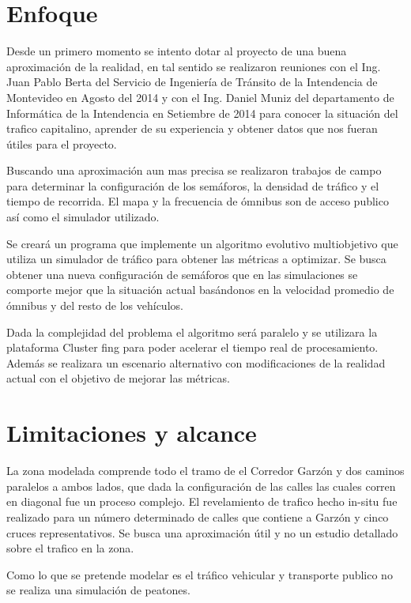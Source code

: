  
\section{Enfoque}

Desde un primero momento se intento dotar al proyecto de una buena aproximación de la realidad, en tal sentido se realizaron reuniones con el Ing. Juan Pablo Berta del Servicio de Ingeniería de Tránsito de la Intendencia de Montevideo en Agosto del  2014 y con el Ing. Daniel Muniz del departamento de Informática de la Intendencia en Setiembre de 2014 para conocer la situación del trafico capitalino, aprender de su experiencia y obtener datos que nos fueran útiles para el proyecto.


Buscando una aproximación aun mas precisa se realizaron trabajos de campo para determinar la configuración de los semáforos, la densidad de tráfico y el tiempo de recorrida. El mapa y la frecuencia de ómnibus son de acceso publico así como el simulador utilizado.

Se creará un programa que implemente un algoritmo evolutivo multiobjetivo que utiliza un simulador de tráfico para obtener las métricas a optimizar. Se busca obtener una nueva configuración de semáforos que en las simulaciones se comporte mejor que la situación actual basándonos en la velocidad promedio de ómnibus y del resto de los vehículos.

Dada la complejidad del problema el algoritmo será paralelo y se utilizara la plataforma Cluster fing para poder acelerar el tiempo real de procesamiento. Además se realizara un escenario alternativo con modificaciones de la realidad actual con el objetivo de mejorar las métricas.

\section{Limitaciones y alcance}

La zona modelada comprende todo el tramo de el Corredor Garzón y dos caminos paralelos a ambos lados, que dada la configuración de las calles las cuales corren en diagonal fue un proceso complejo.
El revelamiento de trafico hecho in-situ fue realizado para un número determinado de calles que contiene a Garzón y cinco cruces representativos. Se busca una aproximación útil y no un estudio detallado sobre el trafico en la zona.

Como lo que se pretende modelar es el tráfico vehicular y transporte publico no se realiza una simulación de peatones.



